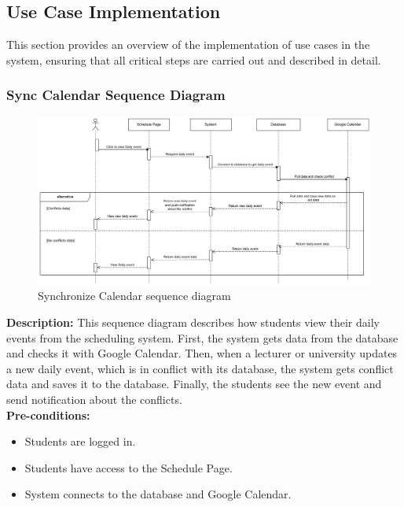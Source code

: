 \subsection{Use Case Implementation}
This section provides an overview of the implementation of use cases in the system, ensuring that
all critical steps are carried out and described in detail.
\subsubsection{Sync Calendar Sequence Diagram}
    \begin{figure}[H]
        \centering
        \includegraphics[width=1\textwidth]{image/SyncCalendar.pdf} 
        \caption{Synchronize Calendar sequence diagram}
        \label{fig:sync_calendar_sequence}
    \end{figure}

    \textbf{Description:} This sequence diagram describes how students view their daily events from the scheduling system. 
    First, the system gets data from the database and checks it with Google Calendar. Then, when a lecturer or university updates a new daily event, which is in conflict with its database, the system gets conflict data and saves it to the database. 
    Finally, the students see the new event and send notification about the conflicts. \\

    \noindent \textbf{Pre-conditions:} 
        \begin{itemize}
            \item Students are logged in.
            \item Students have access to the Schedule Page.
            \item System connects to the database and Google Calendar.
        \end{itemize}

